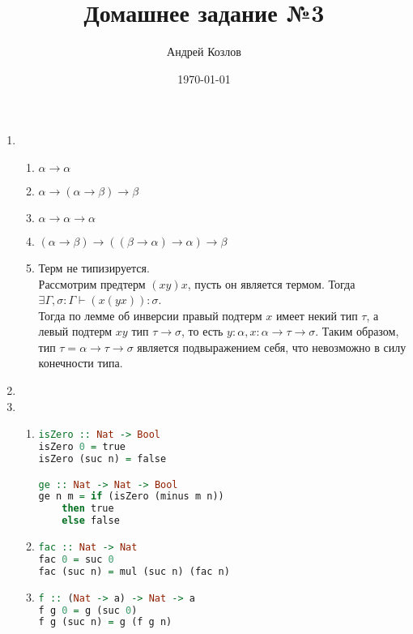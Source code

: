\documentclass[12pt,a4paper]{article}
\begin{document}
\title{Домашнее задание №3}
\author{Андрей Козлов}
\date{\today}

\maketitle

\begin{enumerate}
\item {
	\begin{enumerate}
		\item $\alpha \rightarrow \alpha$
		\item $\alpha \rightarrow (\alpha \rightarrow \beta) \rightarrow \beta$
		\item $\alpha \rightarrow \alpha \rightarrow \alpha$
		\item $(\alpha \rightarrow \beta) \rightarrow ((\beta \rightarrow \alpha) \rightarrow \alpha) \rightarrow \beta$
		\item {
			Терм не типизируется.\\
			Рассмотрим предтерм $(x y) x$, пусть он является термом. Тогда $\exists \Gamma, \sigma \colon \Gamma \vdash (x (y x)) \colon \sigma$.\\
			Тогда по лемме об инверсии правый подтерм $x$ имеет некий тип $\tau$, а левый подтерм $x y$ тип $\tau \rightarrow \sigma$, то есть $y \colon \alpha, x \colon \alpha \rightarrow \tau \rightarrow \sigma$. Таким образом, тип $\tau =  \alpha \rightarrow \tau \rightarrow \sigma$ является подвыражением себя, что невозможно в силу конечности типа.
		}
	\end{enumerate}
}
\item
\item {
	\begin{enumerate}
		\item {
			\begin{lstlisting}[language=Haskell]
isZero :: Nat -> Bool
isZero 0 = true
isZero (suc n) = false

ge :: Nat -> Nat -> Bool
ge n m = if (isZero (minus m n))
	then true
	else false
			\end{lstlisting}
		}
		\item {
			\begin{lstlisting}[language=Haskell]
fac :: Nat -> Nat
fac 0 = suc 0
fac (suc n) = mul (suc n) (fac n)
			\end{lstlisting}
		}
		\item {
			\begin{lstlisting}[language=Haskell]
f :: (Nat -> a) -> Nat -> a
f g 0 = g (suc 0)
f g (suc n) = g (f g n)


\end{lstlisting}}
\end{enumerate}}
\end{enumerate}
\end{document}
